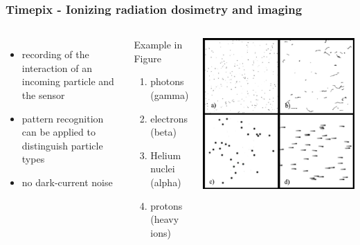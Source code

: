 \documentclass[aspectratio=169]{beamer}
\begin{document}
\begin{frame}
\frametitle{Timepix - Ionizing radiation dosimetry and imaging}

\begin{columns}[c]


\begin{itemize}
  \item recording of the interaction of an incoming particle and the sensor
  \item pattern recognition can be applied to distinguish particle types
  \item no dark-current noise
\end{itemize}

\begin{block}{Example in Figure}
\begin{enumerate}[label=(\alph*)]
  \item photons (gamma)
  \item electrons (beta)
  \item Helium nuclei (alpha)
  \item protons (heavy ions)
\end{enumerate}
\end{block}

\includegraphics[width=1.0\textwidth]{./fig/particle_types_inverted.png}

\end{columns}

\end{frame}
\end{document}
